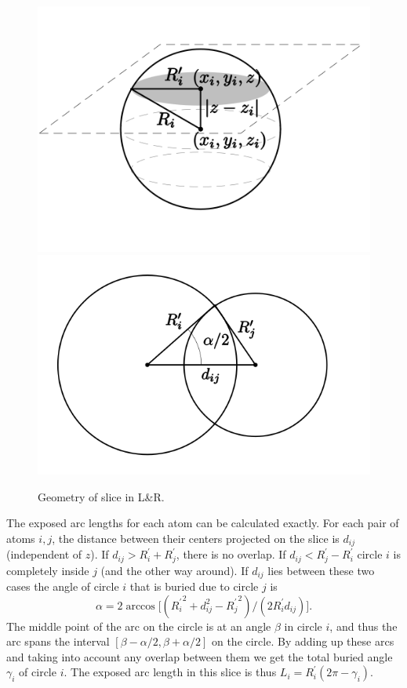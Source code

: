 \documentclass[a4paper,11pt]{article}
\begin{document}
\begin{figure}
\includegraphics{fig/lnr_slice}
\includegraphics{fig/lnr_circles}
\caption{Geometry of slice in L\&R.\label{fig:slice}}
\end{figure}

The exposed arc lengths for each atom can be calculated exactly. For
each pair of atoms $i,j$, the distance between their centers projected
on the slice is $d_{ij}$ (independent of $z$). If $d_{ij} > R_i^\prime
+ R_j^\prime$, there is no overlap. If $d_{ij} < R_j^\prime -
R_i^\prime$ circle $i$ is completely inside $j$ (and the other way
around). If $d_{ij}$ lies between these two cases the angle of circle
$i$ that is buried due to circle $j$ is $$\alpha = 2\arccos
\bigl[({R_i^\prime}^2 + d_{ij}^2 - {R_{j}^\prime}^2)/(2R_i^\prime
  d_{ij})\bigr].$$ The middle point of the arc on the circle is at an
angle $\beta$ in circle $i$, and thus the arc spans the interval
$[\beta-\alpha/2,\beta+\alpha/2]$ on the circle. By adding up these
arcs and taking into account any overlap between them we get the total
buried angle $\gamma_i$ of circle $i$. The exposed arc length in this
slice is thus $L_i = R_i^\prime(2\pi-\gamma_i)$.
\end{document}
